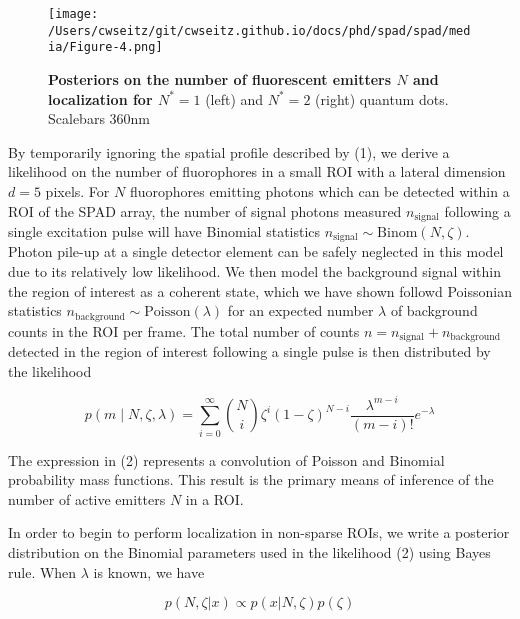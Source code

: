 \begin{figure}[t]
\centering
\texttt{[image: /Users/cwseitz/git/cwseitz.github.io/docs/phd/spad/spad/media/Figure-4.png]}
\caption{\textbf{Posteriors on the number of fluorescent emitters $N$ and localization for $N^{*}=1$} (left) and $N^{*}=2$ (right) quantum dots. Scalebars 360nm}
\label{fig:fig7}
\end{figure}   

By temporarily ignoring the spatial profile described by (1), we derive a likelihood on the number of fluorophores in a small ROI with a lateral dimension $d = 5$ pixels. For $N$ fluorophores emitting photons which can be detected within a ROI of the SPAD array, the number of signal photons measured $n_{\mathrm{signal}}$ following a single excitation pulse will have Binomial statistics $n_{\mathrm{signal}} \sim \mathrm{Binom}(N,\zeta)$. Photon pile-up at a single detector element can be safely neglected in this model due to its relatively low likelihood. We then model the background signal within the region of interest as a coherent state, which we have shown followd Poissonian statistics $n_{\mathrm{background}} \sim \mathrm{Poisson}(\lambda)$ for an expected number $\lambda$ of background counts in the ROI per frame. The total number of counts $n=n_{\mathrm{signal}}+n_{\mathrm{background}}$ detected in the region of interest following a single pulse is then distributed by the likelihood

\begin{equation}
p(m \mid N,\zeta,\lambda) = \sum_{i=0}^{\infty} \binom{N}{i} \zeta^i (1-\zeta)^{N-i} \frac{\lambda^{m-i}}{(m-i)!} e^{-\lambda}
\end{equation}

The expression in (2) represents a convolution of Poisson and Binomial probability mass functions. This result is the primary means of inference of the number of active emitters $N$ in a ROI.

In order to begin to perform localization in non-sparse ROIs, we write a posterior distribution on the Binomial parameters used in the likelihood (2) using Bayes rule. When $\lambda$ is known, we have

\begin{equation}
p(N,\zeta\lvert x) \propto p(x\lvert N,\zeta)p(\zeta)
\end{equation}

